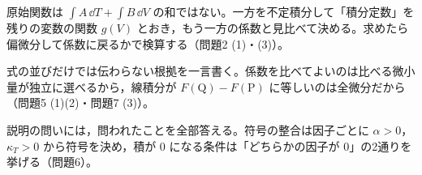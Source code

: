 \documentclass[uplatex,dvipdfmx,a4paper,11pt]{jsarticle}
\begin{document}
\matome
\begin{saitenichiran}
\end{saitenichiran}
\begin{daiji}
  \item 原始関数は $\int A\,\dd T + \int B\,\dd V$ の和ではない。一方を不定積分して「積分定数」を残りの変数の関数 $g(V)$ とおき，もう一方の係数と見比べて決める。求めたら偏微分して係数に戻るかで検算する（問題2 (1)・(3)）。
  \item 式の並びだけでは伝わらない根拠を一言書く。係数を比べてよいのは比べる微小量が独立に選べるから，線積分が $F(\mathrm{Q})-F(\mathrm{P})$ に等しいのは全微分だから（問題5 (1)(2)・問題7 (3)）。
  \item 説明の問いには，問われたことを全部答える。符号の整合は因子ごとに $\alpha>0$，$\kappa_{T}>0$ から符号を決め，積が 0 になる条件は「どちらかの因子が 0」の2通りを挙げる（問題6）。
\end{daiji}
\end{document}
